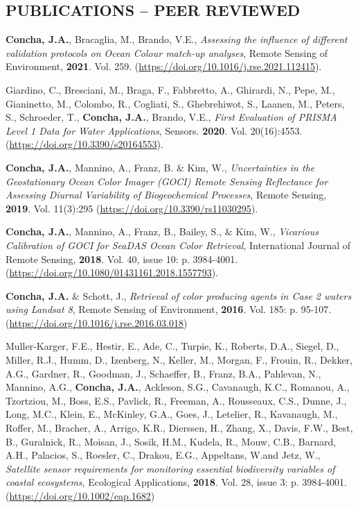 \documentclass[11pt]{res} %
\begin{document}
\begin{resume}
\vspace{-0.3in}   
\section{PUBLICATIONS -- PEER REVIEWED}
\vspace{0.05in}
{\bf Concha, J.A.}, Bracaglia, M., Brando, V.E., {\it Assessing the influence of different validation protocols on Ocean Colour match-up analyses}, Remote Sensing of Environment, {\bf 2021}.  Vol. 259. (\url{https://doi.org/10.1016/j.rse.2021.112415}).

Giardino, C., Bresciani, M., Braga, F., Fabbretto, A., Ghirardi, N., Pepe, M., Gianinetto, M., Colombo, R., Cogliati, S., Ghebrehiwot, S., Laanen, M., Peters, S., Schroeder, T., {\bf Concha, J.A.}, Brando, V.E., {\it First Evaluation of PRISMA Level 1 Data for Water Applications}, Sensors. {\bf 2020}. Vol. 20(16):4553. (\url{https://doi.org/10.3390/s20164553}).

{\bf Concha, J.A.}, Mannino, A., Franz, B. $\&$ Kim, W., {\it Uncertainties in the Geostationary Ocean Color Imager (GOCI) Remote Sensing Reflectance for Assessing Diurnal Variability of Biogeochemical Processes}, Remote Sensing, {\bf 2019}. Vol. 11(3):295 (\url{https://doi.org/10.3390/rs11030295}).

{\bf Concha, J.A.}, Mannino, A., Franz, B., Bailey, S., $\&$ Kim, W., {\it Vicarious Calibration of GOCI for SeaDAS Ocean Color Retrieval}, International Journal of Remote Sensing, {\bf 2018}. Vol. 40, issue 10: p. 3984-4001. (\url{https://doi.org/10.1080/01431161.2018.1557793}).

{\bf Concha, J.A.} $\&$ Schott, J., {\it Retrieval of color producing agents in Case 2 waters using Landsat 8}, Remote Sensing of Environment, {\bf 2016}. Vol. 185: p. 95-107. (\url{https://doi.org/10.1016/j.rse.2016.03.018})

Muller‐Karger, F.E., Hestir, E., Ade, C., Turpie, K., Roberts, D.A., Siegel, D., Miller, R.J., Humm, D., Izenberg, N., Keller, M., Morgan, F., Frouin, R., Dekker, A.G., Gardner, R., Goodman, J., Schaeffer, B., Franz, B.A., Pahlevan, N., Mannino, A.G., {\bf Concha, J.A.}, Ackleson, S.G., Cavanaugh, K.C., Romanou, A., Tzortziou, M., Boss, E.S., Pavlick, R., Freeman, A., Rousseaux, C.S., Dunne, J., Long, M.C., Klein, E., McKinley, G.A., Goes, J., Letelier, R., Kavanaugh, M., Roffer, M., Bracher, A., Arrigo, K.R., Dierssen, H., Zhang, X., Davis, F.W., Best, B., Guralnick, R., Moisan, J., Sosik, H.M., Kudela, R., Mouw, C.B., Barnard, A.H., Palacios, S., Roesler, C., Drakou, E.G., Appeltans, W.and Jetz, W., {\it Satellite sensor requirements for monitoring essential biodiversity variables of coastal ecosystems}, Ecological Applications, {\bf 2018}. Vol. 28, issue 3: p. 3984-4001. (\url{https://doi.org/10.1002/eap.1682})


\end{resume}
\end{document}
